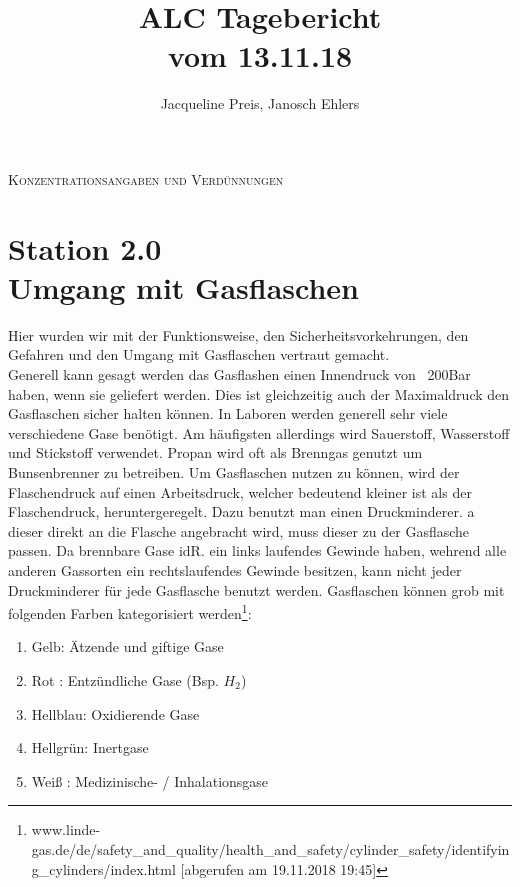 \documentclass[11pt, a4paper]{article}
\begin{document}
\title{ALC Tagebericht\\vom 13.11.18}
\author{Jacqueline Preis, Janosch Ehlers}
\maketitle

	\begin{center}
	\textsc{Konzentrationsangaben und Verdünnungen}
	\end{center}

\section*{Station 2.0\\Umgang mit Gasflaschen}

Hier wurden wir mit der Funktionsweise, den Sicherheitsvorkehrungen, den Gefahren und den Umgang mit Gasflaschen vertraut gemacht.\\

Generell kann gesagt werden das Gasflashen einen Innendruck von ~200Bar haben, wenn sie geliefert werden. Dies ist gleichzeitig auch der Maximaldruck den Gasflaschen sicher halten können. In Laboren werden generell sehr viele verschiedene Gase benötigt. Am häufigsten allerdings wird Sauerstoff, Wasserstoff und Stickstoff verwendet. Propan wird oft als Brenngas genutzt um Bunsenbrenner zu betreiben. Um Gasflaschen nutzen zu können, wird der Flaschendruck auf einen Arbeitsdruck, welcher bedeutend kleiner ist als der Flaschendruck, heruntergeregelt. Dazu benutzt man einen Druckminderer. a dieser direkt an die Flasche angebracht wird, muss dieser zu der Gasflasche passen. Da brennbare Gase idR. ein links laufendes Gewinde haben, wehrend alle anderen Gassorten ein rechtslaufendes Gewinde besitzen, kann nicht jeder Druckminderer für jede Gasflasche benutzt werden. Gasflaschen können grob mit folgenden Farben kategorisiert werden\footnote{www.linde-gas.de/de/safety\_and\_quality/health\_and\_safety/cylinder\_safety/identifying\_cylinders/index.html [abgerufen am 19.11.2018 19:45]}:
\begin{enumerate}
\item Gelb: Ätzende und giftige Gase
\item Rot : Entzündliche Gase (Bsp. $H_2$)
\item Hellblau: Oxidierende Gase
\item Hellgrün: Inertgase
\item Weiß : Medizinische- / Inhalationsgase
\end{enumerate}
\newpage
\end{document}
